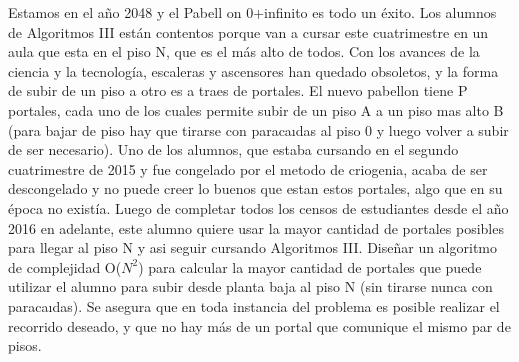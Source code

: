 Estamos en el año 2048 y el Pabell on 0+infinito es todo un  éxito. Los alumnos de Algoritmos III están
contentos porque van a cursar este cuatrimestre en un aula que esta en el piso N, que es el más alto de
todos. Con los avances de la ciencia y la tecnología, escaleras y ascensores han quedado obsoletos, y la
forma de subir de un piso a otro es a traes de portales. El nuevo pabellon tiene P portales, cada uno
de los cuales permite subir de un piso A a un piso mas alto B (para bajar de piso hay que tirarse con
paracaıdas al piso 0 y luego volver a subir de ser necesario). Uno de los alumnos, que estaba cursando en
el segundo cuatrimestre de 2015 y fue congelado por el metodo de criogenia, acaba de ser descongelado
y no puede creer lo buenos que estan estos portales, algo que en su época no existía. Luego de completar
todos los censos de estudiantes desde el año 2016 en adelante, este alumno quiere usar la mayor cantidad
de portales posibles para llegar al piso N y asi seguir cursando Algoritmos III. Diseñar un algoritmo de
complejidad O($N^2$) para calcular la mayor cantidad de portales que puede utilizar el alumno para subir
desde planta baja al piso N (sin tirarse nunca con paracaıdas). Se asegura que en toda instancia del
problema es posible realizar el recorrido deseado, y que no hay más de un portal que comunique el mismo
par de pisos.
